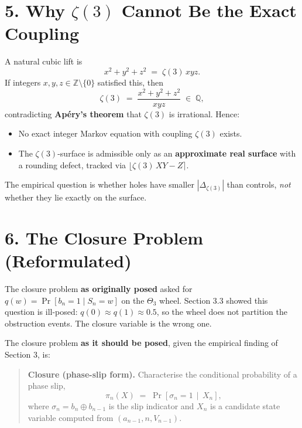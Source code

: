 \documentclass[
  11pt,
]{article}
\providecommand{\tightlist}{%
  \setlength{\itemsep}{0pt}\setlength{\parskip}{0pt}}
\begin{document}
\hypertarget{why-zeta3-cannot-be-the-exact-coupling}{%
\section{\texorpdfstring{5. Why \(\zeta(3)\) Cannot Be the Exact
Coupling}{5. Why \textbackslash zeta(3) Cannot Be the Exact Coupling}}\label{why-zeta3-cannot-be-the-exact-coupling}}

A natural cubic lift is \[
x^2 + y^2 + z^2 \;=\; \zeta(3)\, xyz.
\] If integers \(x, y, z \in \mathbb{Z} \setminus \{0\}\) satisfied
this, then \[
\zeta(3) \;=\; \frac{x^2 + y^2 + z^2}{xyz} \;\in\; \mathbb{Q},
\] contradicting \textbf{Apéry's theorem} that \(\zeta(3)\) is
irrational. Hence:

\begin{itemize}
\tightlist
\item
  No exact integer Markov equation with coupling \(\zeta(3)\) exists.
\item
  The \(\zeta(3)\)-surface is admissible only as an \textbf{approximate
  real surface} with a rounding defect, tracked via
  \(\lfloor \zeta(3)\, XY - Z \rceil\).
\end{itemize}

The empirical question is whether holes have smaller
\(|\Delta_{\zeta(3)}|\) than controls, \emph{not} whether they lie
exactly on the surface.

\hypertarget{the-closure-problem-reformulated}{%
\section{6. The Closure Problem
(Reformulated)}\label{the-closure-problem-reformulated}}

The closure problem \textbf{as originally posed} asked for
\(q(w) = \Pr[b_n = 1 \mid S_n = w]\) on the \(\Theta_3\) wheel. Section
3.3 showed this question is ill-posed:
\(q(0) \approx q(1) \approx 0.5\), so the wheel does not partition the
obstruction events. The closure variable is the wrong one.

The closure problem \textbf{as it should be posed}, given the empirical
finding of Section 3, is:

\begin{quote}
\textbf{Closure (phase-slip form).} Characterise the conditional
probability of a phase slip, \[
\pi_n(X) \;=\; \Pr\!\left[\sigma_n = 1 \,\middle|\, X_n\right],
\] where \(\sigma_n = b_n \oplus b_{n-1}\) is the slip indicator and
\(X_n\) is a candidate state variable computed from
\((a_{n-1}, n, V_{n-1})\).
\end{quote}
\end{document}

